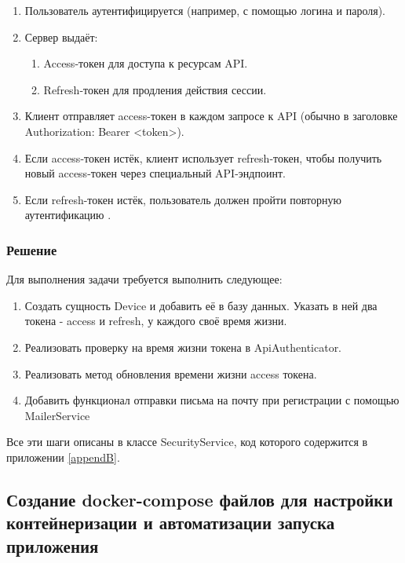 \documentclass[pract]{SCWorks}
\begin{document}
\begin{enumerate}
    \item Пользователь аутентифицируется (например, с помощью логина и пароля).
    \item Сервер выдаёт:
    \begin{enumerate}
        \item Access-токен для доступа к ресурсам API.
        \item Refresh-токен для продления действия сессии.
    \end{enumerate}
    \item Клиент отправляет access-токен в каждом запросе к API 
    (обычно в заголовке Authorization: Bearer <token>).
    \item Если access-токен истёк, клиент использует refresh-токен, 
    чтобы получить новый access-токен через специальный API-эндпоинт.
    \item Если refresh-токен истёк, пользователь должен пройти повторную 
    аутентификацию \cite{baeldung_tokens, auth0_refresh_tokens}.
\end{enumerate}

\subsubsection{Решение}

Для выполнения задачи требуется выполнить следующее:

\begin{enumerate}
    \item Создать сущность Device и добавить её в базу данных. Указать в
    ней два токена - access и refresh, у каждого своё время жизни.
    \item Реализовать проверку на время жизни токена в ApiAuthenticator.
    \item Реализовать метод обновления времени жизни access токена.
    \item Добавить функционал отправки письма на почту при регистрации
    с помощью MailerService
\end{enumerate}

Все эти шаги описаны в классе SecurityService, код которого содержится в 
приложении \ref{appendB}.

\subsection{Создание docker-compose файлов для настройки
    контейнеризации и автоматизации запуска приложения}
\end{document}
